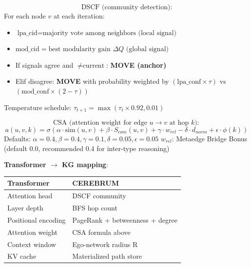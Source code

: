 \documentclass[10pt,journal,compsoc]{IEEEtran}
\begin{document}
\begin{equation}
\text{DSCF (community detection):}
\end{equation}
For each node $v$ at each iteration:
\begin{itemize}
\item $\text{lpa\_cid} = \text{majority vote among neighbors (local signal)}$
\item $\text{mod\_cid} = \text{best modularity gain } \Delta Q \text{ (global signal)}$
\item If signals agree and $\neq \text{current}$: \textbf{MOVE (anchor)}
\item Elif disagree: \textbf{MOVE} with probability weighted by $(\text{lpa\_conf} \times \tau)$ vs $(\text{mod\_conf} \times (2-\tau))$

\end{itemize}
Temperature schedule: $\tau_{t+1} = \max(\tau_t \times 0.92, 0.01)$

\begin{equation}
\text{CSA (attention weight for edge } u \to v \text{ at hop } k):
\end{equation}
\begin{equation}
a(u,v,k) = \sigma( \alpha \cdot \text{sim}(u,v) + \beta \cdot S_{com}(u,v) + \gamma \cdot w_{rel} - \delta \cdot d_{norm} + \epsilon \cdot \phi(k) )
\end{equation}
Defaults: $\alpha=0.4, \beta=0.4, \gamma=0.1, \delta=0.05, \epsilon=0.05$
$w_{rel}$: Metaedge Bridge Bonus (default 0.0, recommended 0.4 for inter-type reasoning)

\textbf{Transformer $\to$ KG mapping}:

\begin{center}
\begin{tabularx}{\columnwidth}{|>{\raggedright\arraybackslash}X|>{\raggedright\arraybackslash}X|}
\hline
Transformer & CEREBRUM \\ \hline
Attention head & DSCF community \\ \hline
Layer depth & BFS hop count \\ \hline
Positional encoding & PageRank + betweenness + degree \\ \hline
Attention weight & CSA formula above \\ \hline
Context window & Ego-network radius R \\ \hline
KV cache & Materi\-alized path store \\ \hline
\end{tabularx}
\end{center}
\end{document}

